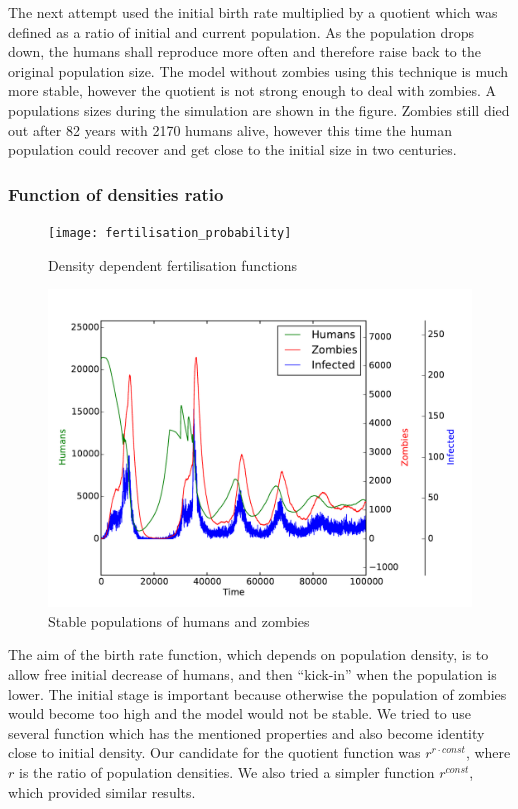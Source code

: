 \documentclass[a4paper]{article}
\begin{document}
The next attempt used the initial birth rate multiplied by a quotient which was defined as a ratio of initial and current population.
As the population drops down, the humans shall reproduce more often and therefore raise back to the original population size.
The model without zombies using this technique is much more stable, however the quotient is not strong enough to deal with zombies.
A populations sizes during the simulation are shown in the figure.
Zombies still died out after 82 years with 2170 humans alive, however this time the human population could recover and get close to the initial size in two centuries.

\subsubsection{Function of densities ratio}

\begin{figure}[pht]
    \centering
    \texttt{[image: fertilisation\_probability]}
    \caption{Density dependent fertilisation functions}
\end{figure}

\begin{figure}[pht]
    \centering
    \includegraphics[width=\textwidth]{stable}
    \caption{Stable populations of humans and zombies}
\end{figure}

The aim of the birth rate function, which depends on population density, is to allow free initial decrease of humans, and then ``kick-in'' when the population is lower.
The initial stage is important because otherwise the population of zombies would become too high and the model would not be stable.
We tried to use several function which has the mentioned properties and also become identity close to initial density.
Our candidate for the quotient function was $r^{r \cdot const}$, where $r$ is the ratio of population densities.
We also tried a simpler function $r^{const}$, which provided similar results.
\end{document}
